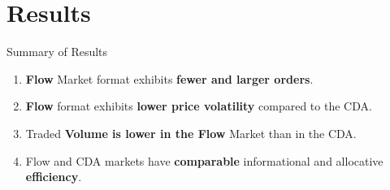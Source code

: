 \documentclass[10pt]{beamer}
\begin{document}
\section{Results}

\begin{frame}{Summary of Results}

\begin{enumerate}
    \item[R1:] \textbf{Flow} Market format exhibits \textbf{fewer and larger orders}.  %
    \vspace{0.5cm}
    
    \item[R2:] \textbf{Flow} format exhibits \textbf{lower price volatility} compared to the CDA.  %
    \vspace{0.5cm}
    
    \item[R3:] Traded \textbf{Volume is lower in the Flow} Market than in the CDA.  %
    \vspace{0.5cm}
    
    \item[R4:] Flow and CDA markets have \textbf{comparable} informational and allocative \textbf{efficiency}.  
    
\end{enumerate}



\end{frame}
\end{document}
